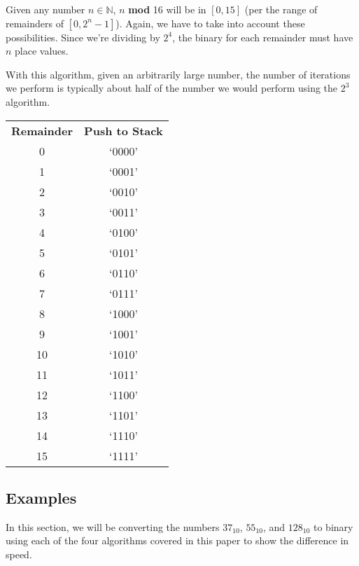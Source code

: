 \documentclass[12pt]{article}
\begin{document}
\par Given any number $n\in\mathbb{N}$, $n$ \textbf{mod} 16 will be in $[0,15]$ (per the range of remainders of $[0,2^n-1]$). Again, we have to take into account these possibilities. Since we're dividing by $2^4$, the binary for each remainder must have $n$ place values.

\par With this algorithm, given an arbitrarily large number, the number of iterations we perform is typically about half of the number we would perform using the $2^3$ algorithm.

\begin{center}
  \begin{tabular}{c|c}
    \textbf{Remainder} & \textbf{Push to Stack} \\
    0 & `0000' \\
    1 & `0001' \\
    2 & `0010' \\
    3 & `0011' \\
    4 & `0100' \\
    5 & `0101' \\
    6 & `0110' \\
    7 & `0111' \\
    8 & `1000' \\
    9 & `1001' \\
    10 & `1010' \\
    11 & `1011' \\
    12 & `1100' \\
    13 & `1101' \\
    14 & `1110' \\
    15 & `1111'
  \end{tabular}
\end{center}



\newpage %



\begin{center}
  \section{Examples}
\end{center}
In this section, we will be converting the numbers $37_{10}$, $55_{10}$, and $128_{10}$ to binary using each of the four algorithms covered in this paper to show the difference in speed.
\end{document}
